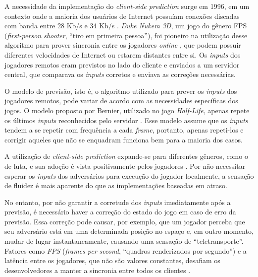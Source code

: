 A necessidade da implementação do \textit{client-side prediction} surge em 1996, em um contexto onde a maioria dos usuários de Internet possuíam conexões discadas com banda entre 28 Kb/s e 34 Kb/s \cite{broadband}. \textit{Duke Nukem 3D}, um jogo do gênero FPS (\textit{first-person shooter}, ``tiro em primeira pessoa''), foi pioneiro na utilização desse algoritmo para prover sincronia entre os jogadores \textit{online} \cite{duke_nukem}, que podem possuir diferentes velocidades de Internet ou estarem distantes entre si. Os \textit{inputs} dos jogadores remotos eram previstos no lado do cliente e enviados a um servidor central, que comparava os \textit{inputs} corretos e enviava as correções necessárias.

O modelo de previsão, isto é, o algoritmo utilizado para prever os \textit{inputs} dos jogadores remotos, pode variar de acordo com as necessidades específicas dos jogos. O modelo proposto por Bernier, utilizado no jogo \textit{Half-Life}, apenas repete os últimos \textit{inputs} reconhecidos pelo servidor \cite{client-side-prediction}. Esse modelo assume que os \textit{inputs} tendem a se repetir com frequência a cada \textit{frame}, portanto, apenas repeti-los e corrigir aqueles que não se enquadram funciona bem para a maioria dos casos.

A utilização de \textit{client-side prediction} expande-se para diferentes gêneros, como o de luta, e sua adoção é vista positivamente pelos jogadores \cite{rollback_success}. Por não necessitar esperar os \textit{inputs} dos adversários para execução do jogador localmente, a sensação de fluidez é mais aparente do que as implementações baseadas em atraso.

No entanto, por não garantir a corretude dos \textit{inputs} imediatamente após a previsão, é necessário haver a correção do estado do jogo em caso de erro da previsão. Essa correção pode causar, por exemplo, que um jogador perceba que seu adversário está em uma determinada posição no espaço e, em outro momento, mudar de lugar instantaneamente, causando uma sensação de ``teletransporte''. Fatores como \textit{FPS} (\textit{frames per second}, ``quadros renderizados por segundo'') e a latência entre os jogadores, que não são valores constantes, desafiam os desenvolvedores a manter a sincronia entre todos os clientes \cite{client-side-prediction}.